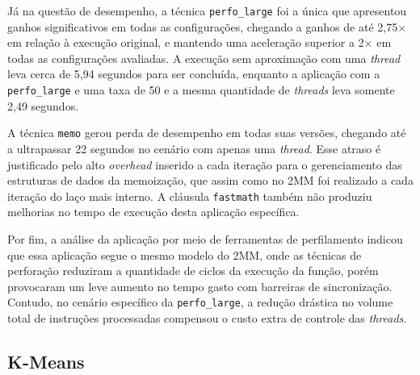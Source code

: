 Já na questão de desempenho, a técnica \texttt{perfo\_large} foi a única que apresentou ganhos significativos em todas as configurações, chegando a ganhos de até 2,75$\times$ em relação à execução original, e mantendo uma aceleração superior a 2$\times$ em todas as configurações avaliadas. A execução sem aproximação com uma \textit{thread} leva cerca de 5,94 segundos para ser concluída, enquanto a aplicação com a \texttt{perfo\_large} e uma taxa de 50 e a mesma quantidade de \textit{threads} leva somente 2,49 segundos.

A técnica \texttt{memo} gerou perda de desempenho em todas suas versões, chegando até a ultrapassar 22 segundos no cenário com apenas uma \textit{thread}. Esse atraso é justificado pelo alto \textit{overhead} inserido a cada iteração para o gerenciamento das estruturas de dados da memoização, que assim como no 2MM foi realizado a cada iteração do laço mais interno. A cláusula \texttt{fastmath} também não produziu melhorias no tempo de execução desta aplicação específica.

Por fim, a análise da aplicação por meio de ferramentas de perfilamento indicou que essa aplicação segue o mesmo modelo do 2MM, onde as técnicas de perforação reduziram a quantidade de ciclos da execução da função, porém provocaram um leve aumento no tempo gasto com barreiras de sincronização. Contudo, no cenário específico da \texttt{perfo\_large}, a redução drástica no volume total de instruções processadas compensou o custo extra de controle das \textit{threads}.

\subsection{K-Means}\label{subsec:kmeans_resultados}

